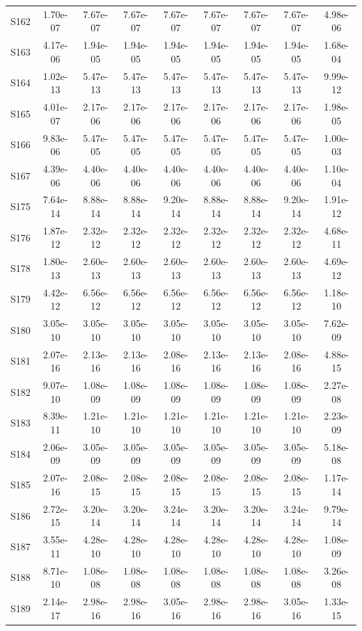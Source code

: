 {\begin{longtable}{l S[table-format=1.2e+2] S[table-format=1.2e+2] S[table-format=1.2e+2] S[table-format=1.2e+2] S[table-format=1.2e+2] S[table-format=1.2e+2] S[table-format=1.2e+2] S[table-format=1.2e+2]}
S162 & 1.70e-07 & 7.67e-07 & 7.67e-07 & 7.67e-07 & 7.67e-07 & 7.67e-07 & 7.67e-07 & 4.98e-06 \\
S163 & 4.17e-06 & 1.94e-05 & 1.94e-05 & 1.94e-05 & 1.94e-05 & 1.94e-05 & 1.94e-05 & 1.68e-04 \\
S164 & 1.02e-13 & 5.47e-13 & 5.47e-13 & 5.47e-13 & 5.47e-13 & 5.47e-13 & 5.47e-13 & 9.99e-12 \\
S165 & 4.01e-07 & 2.17e-06 & 2.17e-06 & 2.17e-06 & 2.17e-06 & 2.17e-06 & 2.17e-06 & 1.98e-05 \\
S166 & 9.83e-06 & 5.47e-05 & 5.47e-05 & 5.47e-05 & 5.47e-05 & 5.47e-05 & 5.47e-05 & 1.00e-03 \\
S167 & 4.39e-06 & 4.40e-06 & 4.40e-06 & 4.40e-06 & 4.40e-06 & 4.40e-06 & 4.40e-06 & 1.10e-04 \\
S175 & 7.64e-14 & 8.88e-14 & 8.88e-14 & 9.20e-14 & 8.88e-14 & 8.88e-14 & 9.20e-14 & 1.91e-12 \\
S176 & 1.87e-12 & 2.32e-12 & 2.32e-12 & 2.32e-12 & 2.32e-12 & 2.32e-12 & 2.32e-12 & 4.68e-11 \\
S178 & 1.80e-13 & 2.60e-13 & 2.60e-13 & 2.60e-13 & 2.60e-13 & 2.60e-13 & 2.60e-13 & 4.69e-12 \\
S179 & 4.42e-12 & 6.56e-12 & 6.56e-12 & 6.56e-12 & 6.56e-12 & 6.56e-12 & 6.56e-12 & 1.18e-10 \\
S180 & 3.05e-10 & 3.05e-10 & 3.05e-10 & 3.05e-10 & 3.05e-10 & 3.05e-10 & 3.05e-10 & 7.62e-09 \\
S181 & 2.07e-16 & 2.13e-16 & 2.13e-16 & 2.08e-16 & 2.13e-16 & 2.13e-16 & 2.08e-16 & 4.88e-15 \\
S182 & 9.07e-10 & 1.08e-09 & 1.08e-09 & 1.08e-09 & 1.08e-09 & 1.08e-09 & 1.08e-09 & 2.27e-08 \\
S183 & 8.39e-11 & 1.21e-10 & 1.21e-10 & 1.21e-10 & 1.21e-10 & 1.21e-10 & 1.21e-10 & 2.23e-09 \\
S184 & 2.06e-09 & 3.05e-09 & 3.05e-09 & 3.05e-09 & 3.05e-09 & 3.05e-09 & 3.05e-09 & 5.18e-08 \\
S185 & 2.07e-16 & 2.08e-15 & 2.08e-15 & 2.08e-15 & 2.08e-15 & 2.08e-15 & 2.08e-15 & 1.17e-14 \\
S186 & 2.72e-15 & 3.20e-14 & 3.20e-14 & 3.24e-14 & 3.20e-14 & 3.20e-14 & 3.24e-14 & 9.79e-14 \\
S187 & 3.55e-11 & 4.28e-10 & 4.28e-10 & 4.28e-10 & 4.28e-10 & 4.28e-10 & 4.28e-10 & 1.08e-09 \\
S188 & 8.71e-10 & 1.08e-08 & 1.08e-08 & 1.08e-08 & 1.08e-08 & 1.08e-08 & 1.08e-08 & 3.26e-08 \\
S189 & 2.14e-17 & 2.98e-16 & 2.98e-16 & 3.05e-16 & 2.98e-16 & 2.98e-16 & 3.05e-16 & 1.33e-15 \\

\end{longtable}}
